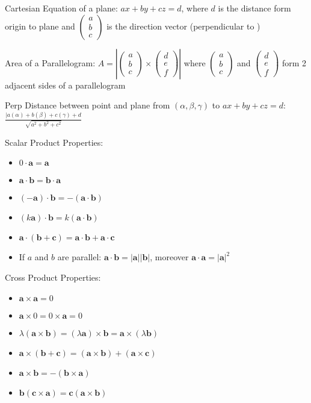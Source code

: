 \documentclass[10pt,a4paper,oneside]{book}
\begin{document}
Cartesian Equation of a plane: $ax+by+cz=d$, where $d$ is the distance form origin to plane and $\begin{pmatrix}
    a\\b\\c
\end{pmatrix}$ is the direction vector (perpendicular to )

Area of a Parallelogram: $A=\left|\begin{pmatrix}
    a\\b\\c
\end{pmatrix}\times \begin{pmatrix}
    d\\e\\f
\end{pmatrix}\right|$ where $\begin{pmatrix}
    a\\b\\c
\end{pmatrix}$ and $\begin{pmatrix}
    d\\e\\f
\end{pmatrix}$ form 2 adjacent sides of a parallelogram 

Perp Distance between point and plane from $(\alpha, \beta, \gamma)$ to $ax+by+cz=d$: $\frac{|a(\alpha)+b(\beta)+c(\gamma)+d}{\sqrt{a^2+b^2+c^2}}$

Scalar Product Properties:
\begin{itemize}
    \item $0\cdot \textbf{a}=\textbf{a}$
    \item $\textbf{a}\cdot \textbf{b}=\textbf{b}\cdot \textbf{a}$
    \item $(-\textbf{a})\cdot \textbf{b}=-(\textbf{a}\cdot \textbf{b})$
    \item $(k\textbf{a})\cdot\textbf{b}=k(\textbf{a}\cdot \textbf{b})$
    \item $\textbf{a}\cdot (\textbf{b}+\textbf{c})=\textbf{a}\cdot\textbf{b}+\textbf{a}\cdot\textbf{c}$
    \item If $a$ and $b$ are parallel: $\textbf{a}\cdot\textbf{b}=|\textbf{a}||\textbf{b}|$, moreover $\textbf{a}\cdot\textbf{a}=|\textbf{a}|^2$
\end{itemize}

Cross Product Properties:
\begin{itemize}
    \item $\textbf{a}\times \textbf{a}=0$
    \item $\textbf{a}\times 0 = 0\times \textbf{a}=0$
    \item $\lambda(\textbf{a}\times \textbf{b})=(\lambda\textbf{a})\times \textbf{b}=\textbf{a}\times (\lambda\textbf{b})$
    \item $\textbf{a}\times (\textbf{b}+\textbf{c})=(\textbf{a}\times \textbf{b})+(\textbf{a}\times \textbf{c})$
    \item $\textbf{a}\times \textbf{b}=-(\textbf{b}\times \textbf{a})$
    \item $\textbf{b}(\textbf{c}\times \textbf{a})=\textbf{c}(\textbf{a}\times \textbf{b})$
\end{itemize}
\end{document}
